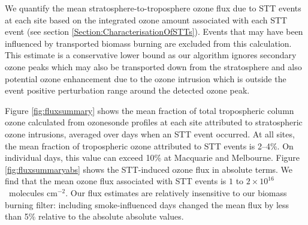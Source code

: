 \documentclass{article}
\begin{document}
  We quantify the mean stratosphere-to-troposphere ozone flux due to STT events at each site based on the integrated ozone amount associated with each STT event (see section \ref{Section:CharacterisationOfSTTs}).
  Events that may have been influenced by transported biomass burning are excluded from this calculation.
  This estimate is a conservative lower bound as our algorithm ignores secondary ozone peaks which may also be transported down from the stratosphere and also potential ozone enhancement due to the ozone intrusion which is outside the event positive perturbation range around the detected ozone peak.
  
  Figure \ref{fig:fluxsummary} shows the mean fraction of total tropospheric column ozone calculated from ozonesonde profiles at each site attributed to stratospheric ozone intrusions, averaged over days when an STT event occurred.
  At all sites, the mean fraction of tropospheric ozone attributed to STT events is 2--4\%. On individual days, this value can exceed 10\% at Macquarie and Melbourne.
  Figure \ref{fig:fluxsummaryabs} shows the STT-induced ozone flux in absolute terms.
  We find that the mean ozone flux associated with STT events is $1$ to $2 \times 10^{16}$~molecules cm$^{-2}$.
  Our flux estimates are relatively insensitive to our biomass burning filter: including smoke-influenced days changed the mean flux by less than 5\% relative to the absolute absolute values.
  
\end{document}
